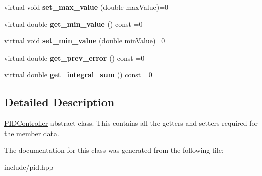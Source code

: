 \begin{DoxyCompactItemize}
virtual void {\bfseries set\+\_\+max\+\_\+value} (double max\+Value)=0
\item 
\mbox{\label{classAbstractPIDController_a69d79599ae7dcff08fdfedfbd6a15419}} 
virtual double {\bfseries get\+\_\+min\+\_\+value} () const =0
\item 
\mbox{\label{classAbstractPIDController_ad5aaaa7291b6d962a2a472c4b94f6fb2}} 
virtual void {\bfseries set\+\_\+min\+\_\+value} (double min\+Value)=0
\item 
\mbox{\label{classAbstractPIDController_aadecb6cc853ad0b290d178a96ac87aa5}} 
virtual double {\bfseries get\+\_\+prev\+\_\+error} () const =0
\item 
\mbox{\label{classAbstractPIDController_a59157c39c2d62bfb426f7ff3cbcfcb25}} 
virtual double {\bfseries get\+\_\+integral\+\_\+sum} () const =0
\end{DoxyCompactItemize}


\subsection{Detailed Description}
\hyperlink{classPIDController}{P\+I\+D\+Controller} abstract class. This contains all the getters and setters required for the member data. 

The documentation for this class was generated from the following file\+:\begin{DoxyCompactItemize}
\item 
include/pid.\+hpp\end{DoxyCompactItemize}
